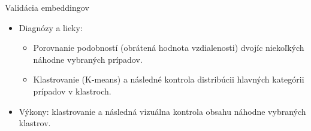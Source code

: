 \documentclass[slovak,10pt]{beamer}
\begin{document}
\begin{frame}{Validácia embeddingov}
	\begin{itemize}
		\item<1> Diagnózy a lieky:
		\begin{itemize}
			\item<1> Porovnanie podobností (obrátená hodnota vzdialenosti) dvojíc niekoľkých náhodne vybraných prípadov.
			\item<1> Klastrovanie (K-means) a následné kontrola distribúcii hlavných kategórii prípadov v klastroch.
		\end{itemize}
		\item<1> Výkony: klastrovanie a následná vizuálna kontrola obsahu náhodne vybraných klastrov.
	\end{itemize}
\end{frame}
\end{document}
